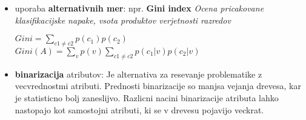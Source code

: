 \documentclass{article}
\begin{document}
\begin{multicols}{2}
\begin{itemize}
  \item uporaba \textbf{alternativnih mer}: npr. \textbf{Gini index}
    \textit{Ocena pricakovane klasifikacijske napake, vsota produktov verjetnosti razredov}
    \begin{center}
      \begin{math}
          Gini = \sum_{c1 \neq c2} p(c_1) p(c_2)
      \end{math}
      \begin{math}
          Gini(A) = \sum_{v} p(v) \sum_{c1 \neq c2} p(c_1 | v) p(c_2 | v)
      \end{math}
    \end{center}
  \item \textbf{binarizacija} atributov:
    Je alternativa za resevanje problematike z vecvrednostmi atributi.
    Prednosti binarizacije so manjsa vejanja drevesa, kar je statisticno bolj zaneslijvo. Razlicni nacini
    binarizacije atributa lahko nastopajo kot samostojni atributi, ki se v drevesu pojavijo veckrat.
\end{itemize}

\end{multicols}
\end{document}
